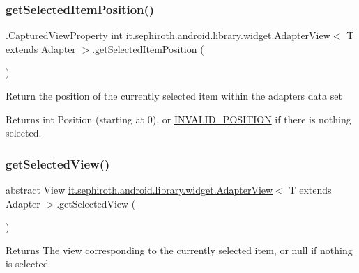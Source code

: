 \subsubsection{\texorpdfstring{get\+Selected\+Item\+Position()}{getSelectedItemPosition()}}
{\footnotesize\ttfamily .Captured\+View\+Property int \hyperlink{classit_1_1sephiroth_1_1android_1_1library_1_1widget_1_1_adapter_view}{it.\+sephiroth.\+android.\+library.\+widget.\+Adapter\+View}$<$ T extends Adapter $>$.get\+Selected\+Item\+Position (\begin{DoxyParamCaption}{ }\end{DoxyParamCaption})}

Return the position of the currently selected item within the adapter\textquotesingle{}s data set

\begin{DoxyReturn}{Returns}
int Position (starting at 0), or \hyperlink{classit_1_1sephiroth_1_1android_1_1library_1_1widget_1_1_adapter_view_a2751b7d592638baeaf149f6da0d4e598}{I\+N\+V\+A\+L\+I\+D\+\_\+\+P\+O\+S\+I\+T\+I\+ON} if there is nothing selected. 
\end{DoxyReturn}
\mbox{\label{classit_1_1sephiroth_1_1android_1_1library_1_1widget_1_1_adapter_view_a30c7157929f8e59df1bf687b4fc8a546}} 
\subsubsection{\texorpdfstring{get\+Selected\+View()}{getSelectedView()}}
{\footnotesize\ttfamily abstract View \hyperlink{classit_1_1sephiroth_1_1android_1_1library_1_1widget_1_1_adapter_view}{it.\+sephiroth.\+android.\+library.\+widget.\+Adapter\+View}$<$ T extends Adapter $>$.get\+Selected\+View (\begin{DoxyParamCaption}{ }\end{DoxyParamCaption})\hspace{0.3cm}{\ttfamily [abstract]}}

\begin{DoxyReturn}{Returns}
The view corresponding to the currently selected item, or null if nothing is selected 
\end{DoxyReturn}
\mbox{\label{classit_1_1sephiroth_1_1android_1_1library_1_1widget_1_1_adapter_view_a5903c15455d85d8a05bcfef8a8d07b58}} 
